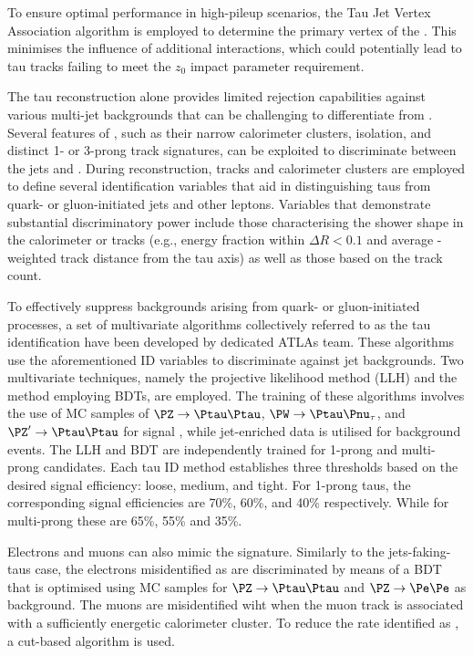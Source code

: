 To ensure optimal performance in high-pileup scenarios, the Tau Jet Vertex Association\cite{ATLAS:2014rzk}
algorithm is employed to determine the primary vertex of the \tauhad. This minimises the
influence of additional interactions, which could potentially lead to tau tracks failing to 
meet the $z_0$ impact parameter requirement\cite{ATLAS:2012voa}.

The tau reconstruction alone provides limited rejection capabilities against various multi-jet backgrounds that can be challenging to differentiate from \tauhad. Several features of \tauhad, 
such as their narrow calorimeter clusters, isolation, and distinct 1- or 3-prong track signatures, 
can be exploited to discriminate between the jets and \tauhad.  During reconstruction, tracks 
and calorimeter clusters are employed to define several identification
variables that aid in distinguishing 
taus from quark- or gluon-initiated jets and other leptons. Variables that demonstrate substantial 
discriminatory power include those characterising the shower shape in the calorimeter or tracks 
(e.g., energy fraction within $\Delta R < 0.1$ and average \pT-weighted track distance from the
tau axis) as well as those based on the track count.

To effectively suppress backgrounds arising from quark- or gluon-initiated processes, 
a set of multivariate algorithms collectively referred to as the tau identification have been 
developed by dedicated ATLAs team. These algorithms use the aforementioned ID variables to
discriminate against jet backgrounds.
Two multivariate techniques, namely the projective likelihood method (LLH) and the method employing BDTs, are employed. The training of these algorithms involves the use of MC
samples of $\PZ \rightarrow \Ptau\Ptau$, $\PW \rightarrow \Ptau\Pnu_{\tau}$, and
$\PZ' \rightarrow \Ptau\Ptau$ for signal \tauhad, while jet-enriched data is utilised for 
background events.  The LLH and BDT are independently trained for 1-prong and multi-prong 
candidates. Each tau ID method establishes three thresholds based on the desired signal 
efficiency: loose, medium, and tight. For 1-prong taus, the corresponding signal efficiencies are
70\%, 60\%, and 40\% respectively. While for multi-prong these are 65\%, 55\% and 35\%.

Electrons and muons can also mimic the \tauhad signature. Similarly to the 
jets-faking-taus case, the electrons misidentified as \tauhad are discriminated by means of a 
BDT that is optimised using MC samples for $\PZ \rightarrow \Ptau\Ptau$ and 
$\PZ \rightarrow \Pe\Pe$ as background. The muons are misidentified wiht \tauhad 
when the muon track is associated with a sufficiently energetic calorimeter cluster.
To reduce the rate \Pmu identified as \tauhad, a cut-based algorithm is used.

